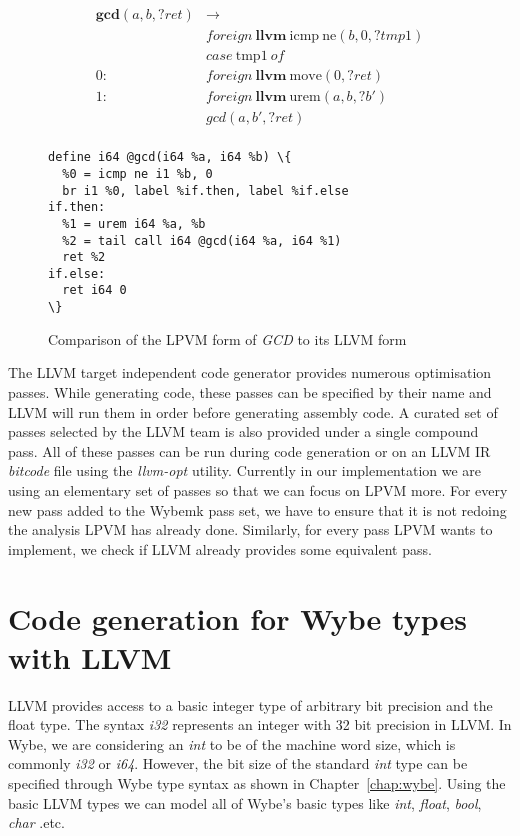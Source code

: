 \begin{figure}
    \begin{align*}
      \mathbf{gc}\mathbf{d}(a,b,?ret) & \rightarrow \\
          & foreign\ \mathbf{llvm}\ \mathrm{icmp}\ \mathrm{ne}(b,0,?tmp1) \\
          & case\ \mathrm{tmp1}\ of \\
      0:\ & foreign\ \mathbf{llvm}\ \mathrm{move}(0,?ret) \\
      1:\ & foreign\ \mathbf{llvm}\ \mathrm{urem}(a,b,?b') \\
          &  gcd(a,b',?ret) \\
    \end{align*}
\begin{Verbatim}[frame=lines,label=LLVM,labelposition=topline,framesep=4mm,fontsize=\small,commandchars=\\\{\}]
define i64 @gcd(i64 %a, i64 %b) \{
  %0 = icmp ne i1 %b, 0 
  br i1 %0, label %if.then, label %if.else
if.then:
  %1 = urem i64 %a, %b
  %2 = tail call i64 @gcd(i64 %a, i64 %1)
  ret %2
if.else:
  ret i64 0
\}
\end{Verbatim}
    \caption{Comparison of the LPVM form of \textit{GCD} to its LLVM form}
  \label{fig:lpvm_to_llvm}
\end{figure}


The LLVM target independent code generator provides numerous optimisation
passes. While generating code, these passes can be specified by their name and
LLVM will run them in order before generating assembly code. A curated set of
passes selected by the LLVM team is also provided under a single compound
pass. All of these passes can be run during code generation or on an LLVM IR
\textit{bitcode} file using the \textit{llvm-opt} utility. Currently in our
implementation we are using an elementary set of passes so that we can focus on
LPVM more. For every new pass added to the Wybemk pass set, we have to ensure
that it is not redoing the analysis LPVM has already done. Similarly, for every
pass LPVM wants to implement, we check if LLVM already provides some equivalent
pass.


\section{Code generation for Wybe types with LLVM}
\label{sec:type_codegen}

LLVM provides access to a basic integer type of arbitrary bit precision and the
float type. The syntax \textit{i32} represents an integer with 32 bit precision
in LLVM. In Wybe, we are considering an \textit{int} to be of the machine word
size, which is commonly \textit{i32} or \textit{i64}. However, the bit size of
the standard \textit{int} type can be specified through Wybe type syntax as
shown in Chapter~\ref{chap:wybe}. Using the basic LLVM types we can model all
of Wybe's basic types like \textit{int}, \textit{float}, \textit{bool},
\textit{char} .etc.

